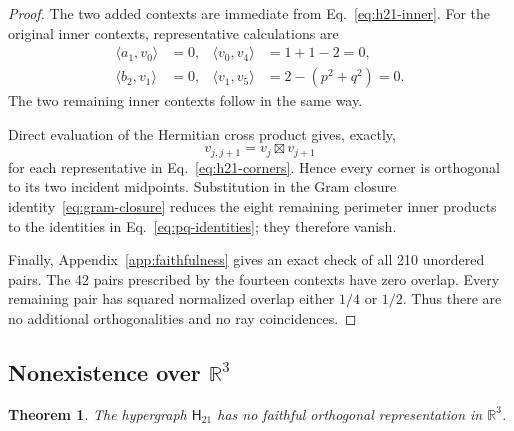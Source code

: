 \documentclass[twocolumn,aps,pra,floatfix,amsmath,amssymb,longbibliography]{revtex4-2}
\newtheorem{theorem}{Theorem}
\theoremstyle{definition}
\theoremstyle{remark}
\newcommand{\R}{\mathbb R}
\newcommand{\Htwentyone}{\mathsf H_{21}}
\begin{document}
\begin{proof}
The two added contexts are immediate from Eq.~\eqref{eq:h21-inner}.
For the original inner contexts, representative calculations are
\begin{align*}
 \langle a_1,v_0\rangle&=0,&
 \langle v_0,v_4\rangle&=1+1-2=0,\\
 \langle b_2,v_1\rangle&=0,&
 \langle v_1,v_5\rangle&=2-(p^2+q^2)=0.
\end{align*}
The two remaining inner contexts follow in the same way.

Direct evaluation of the Hermitian cross product gives, exactly,
\[
 v_{j,j+1}=v_j\boxtimes v_{j+1}
\]
for each representative in Eq.~\eqref{eq:h21-corners}.  Hence every
corner is orthogonal to its two incident midpoints.  Substitution in the
Gram closure identity~\eqref{eq:gram-closure} reduces the eight remaining
perimeter inner products to the identities in
Eq.~\eqref{eq:pq-identities}; they therefore vanish.

Finally, Appendix~\ref{app:faithfulness} gives an exact check of all 210
unordered pairs.  The 42 pairs prescribed by the fourteen contexts have
zero overlap.  Every remaining pair has squared normalized overlap
either $1/4$ or $1/2$.  Thus there are no additional orthogonalities and
no ray coincidences.
\end{proof}

\subsection{Nonexistence over \texorpdfstring{$\R^3$}{R3}}

\begin{theorem}
\label{thm:h21-real}
The hypergraph $\Htwentyone$ has no faithful orthogonal representation
in $\R^3$.
\end{theorem}
\end{document}
